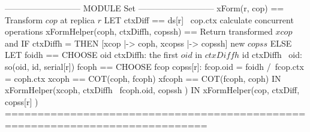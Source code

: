 \documentclass{article}
\begin{document}
\begin{tla}
--------------------------- MODULE Set ---------------------------
xForm(r, cop) == \* Transform $cop$ at replica $r$
    LET ctxDiff == ds[r] \ cop.ctx \* calculate concurrent operations
        xFormHelper(coph, ctxDiffh, copssh) == \* Return transformed $xcop$ and
            IF ctxDiffh = {} THEN [xcop |-> coph, xcopss |-> copssh]  \* new $copss$ 
            ELSE LET foidh == CHOOSE oid \in ctxDiffh: \* the first $oid$ in $ctxDiffh$ 
                                \A id \in ctxDiffh \ {oid}: so(oid, id, serial[r]) 
                     fcoph == CHOOSE fcop \in copss[r]: 
                                fcop.oid = foidh /\ fcop.ctx = coph.ctx \* \cc
                     xcoph == COT(coph, fcoph)    xfcoph == COT(fcoph, coph)
                 IN  xFormHelper(xcoph, ctxDiffh \ {fcoph.oid}, 
                                        copssh )
    IN  xFormHelper(cop, ctxDiff, copss[r] ) 
=============================================================================
\end{tla}
\end{document}
